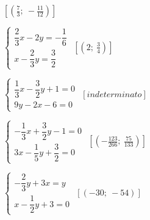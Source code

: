 \begin{esercizio}[\Ast]
\begin{multicols}{2}
\begin{enumeratea}
 \hfill \(\left[\left(\frac{7}{3};~-\frac{11}{12}\right)\right]\)
{\longarray
\item 
\(\left\{\begin{array}{l}\dfrac{2}{3}x-2y=-{\dfrac{1}{6}}\\x-\dfrac{2}{3}
y=\dfrac{3}{2} \end{array}\right.\)
 \hfill \(\left[\left(2;~\frac{3}{4}\right)\right]\)
\item \(\left\{\begin{array}{l}\dfrac{1}{3}x-\dfrac{3}{2}y+1=0\\9y-2x-6=0 
\end{array}\right.\)
 \hfill \(\left[indeterminato\right]\)
\item 
\(\left\{\begin{array}{l}-{\dfrac{1}{3}}x+\dfrac{3}{2}y-1=0\\3x-\dfrac{1}{5}
y+\dfrac{3}{2}=0 \end{array}\right.\)
 \hfill \(\left[(-{\frac{123}{266}};~\frac{75}{133})\right]\)
\item \(\left\{\begin{array}{l}-{\dfrac{2}{3}}y+3x=y\\x-\dfrac{1}{2}y+3=0 
\end{array}\right.\)
 \hfill \(\left[(-30;~-54)\right]\)}
\end{enumeratea}
\end{multicols}
\end{esercizio}

